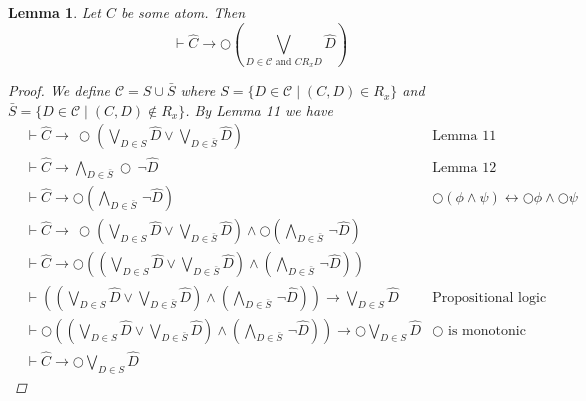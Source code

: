 \documentclass[11pt]{article}
\newtheorem{lemma}[theorem]{Lemma}
\theoremstyle{definition}
\theoremstyle{remark}
\begin{document}
\begin{lemma}
    Let $C$ be some atom. Then
    \[  
        \vdash \hat{C} \rightarrow \bigcirc (\bigvee_{D \in \mathcal{C} \text{ and } C R_x D} \hat{D})
    \]

    \begin{proof}
        We define $\mathcal{C} = S \cup \bar{S}$ where $S = \{D \in \mathcal{C} \mid (C,D) \in R_x \}$ and $\bar{S} = \{D \in \mathcal{C} \mid  (C,D) \notin R_x\}$.
        By Lemma 11 we have 
        \[
            \begin{array}{rll}
                & \vdash \hat{C} \rightarrow \, \bigcirc (\bigvee_{D \in S} \hat{D} \lor \bigvee_{D \in \bar{S}} \hat{D})
                &\text{Lemma 11} \\
                & \vdash \hat{C} \rightarrow \bigwedge_{D \in \bar{S}} \bigcirc \, \neg \hat{D} 
                &\text{Lemma 12} \\
                & \vdash \hat{C} \rightarrow \bigcirc (\bigwedge_{D \in \bar{S}} \, \neg \hat{D}) 
                & \text{$\bigcirc (\phi \land \psi) \leftrightarrow \bigcirc \phi \land \bigcirc \psi$} \\
                & \vdash \hat{C} \rightarrow  \, \bigcirc (\bigvee_{D \in S} \hat{D} \lor \bigvee_{D \in \bar{S}} \hat{D}) \land
                \bigcirc (\bigwedge_{D \in \bar{S}} \, \neg \hat{D}) \\
                & \vdash \hat{C} \rightarrow  \bigcirc  ((\bigvee_{D \in S} \hat{D} \lor \bigvee_{D \in \bar{S}} \hat{D}) \land
                (\bigwedge_{D \in \bar{S}} \, \neg \hat{D})) \\
                & \vdash  ((\bigvee_{D \in S} \hat{D} \lor \bigvee_{D \in \bar{S}} \hat{D}) \land (\bigwedge_{D \in \bar{S}} \, \neg \hat{D})) \rightarrow \bigvee_{D \in S} \hat{D}  
                & \text{Propositional logic} \\
                & \vdash \bigcirc ((\bigvee_{D \in S} \hat{D} \lor \bigvee_{D \in \bar{S}} \hat{D}) \land (\bigwedge_{D \in \bar{S}} \, \neg \hat{D})) \rightarrow \bigcirc \bigvee_{D \in S} \hat{D}
                & \text{$\bigcirc$ is monotonic} \\
                & \vdash \hat{C} \rightarrow \bigcirc \bigvee_{D \in S} \hat{D}

            \end{array}
        \]


    \end{proof}
 \end{lemma}
\end{document}

